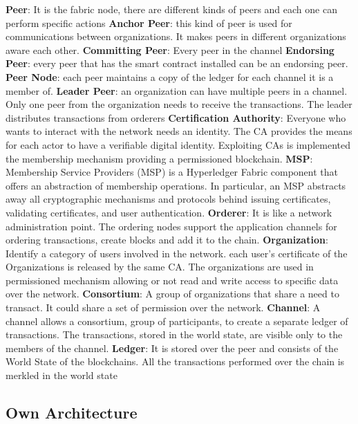 \begin{outline}[enumerate]
    \1 \textbf{Peer}: It is the fabric node, there are different kinds of peers and each one can perform
    specific actions
    \2 \textbf{Anchor Peer}: this kind of peer is used for communications between organizations. It makes peers in different organizations aware each other.
    \2 \textbf{Committing Peer}: Every peer in the channel
    \2 \textbf{Endorsing Peer}: every peer that has the smart contract installed can be an endorsing peer.
    \2 \textbf{Peer Node}: each peer maintains a copy of the ledger for each channel it is a member of.
    \2 \textbf{Leader Peer}: an organization can have multiple peers in a channel. Only one peer from the organization 
    needs to receive the transactions. The leader distributes transactions from orderers    
    \1 \textbf{Certification Authority}: Everyone who wants to interact with the network needs an identity. The CA 
    provides the means for each actor to have a verifiable digital identity. Exploiting CAs is implemented the 
    membership mechanism providing a permissioned blockchain. 
    \1 \textbf{MSP}: Membership Service Providers (MSP) is a Hyperledger Fabric component that offers an abstraction 
    of membership operations. In particular, an MSP abstracts away all cryptographic mechanisms and protocols behind 
    issuing certificates, validating certificates, and user authentication.
    \1 \textbf{Orderer}: It is like a network administration point. The ordering nodes support the application channels 
    for ordering transactions, create blocks and add it to the chain.  
    \1 \textbf{Organization}: Identify a category of users involved in the network. each user's certificate of the 
    Organizations is released by the same CA. The organizations are used in permissioned mechanism allowing or not 
    read and write access to specific data over the network.
    \1 \textbf{Consortium}: A group of organizations that share a need to transact. It could share a set of permission 
    over the network.
    \1 \textbf{Channel}: A channel allows a consortium, group of participants, to create a separate ledger of 
    transactions. The transactions, stored in the world state, are visible only to the members of the channel.
    \1 \textbf{Ledger}: It is stored over the peer and consists of the World State of the blockchains. All the 
    transactions performed over the chain is merkled in the world state\cite{merkle}
\end{outline}


\subsection{Own Architecture}

